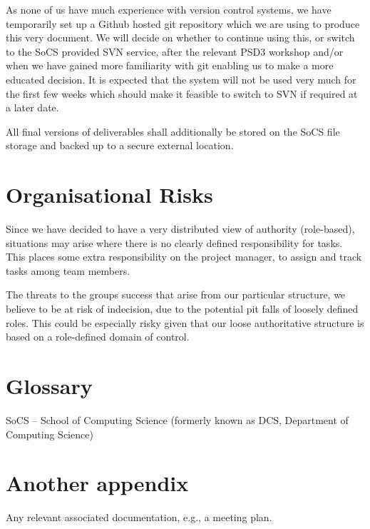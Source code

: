\documentclass{l3deliverable}
\begin{document}
As none of us have much experience with version control systems, we have temporarily set up a Github hosted git repository which we are using to produce this very document. We will decide on whether to continue using this, or switch to the SoCS provided SVN service, after the relevant PSD3 workshop and/or when we have gained more familiarity with git enabling us to make a more educated decision. It is expected that the system will not be used very much for the first few weeks which should make it feasible to switch to SVN if required at a later date.

All final versions of deliverables shall additionally be stored on the SoCS file storage and backed up to a secure external location.


\section{Organisational Risks}

Since we have decided to have a very distributed view of authority (role-based), situations may arise where there is no clearly defined responsibility for tasks. This places some extra responsibility on the project manager, to assign and track tasks among team members.

The threats to the groups success that arise from our particular structure, we believe to be at risk of indecision, due to the potential pit falls of loosely defined roles. This could be especially risky given that our loose authoritative structure is based on a role-defined domain of control.


\appendix

\section{Glossary}

SoCS -- School of Computing Science (formerly known as DCS, Department of Computing Science)

\section{Another appendix}

Any relevant associated documentation, e.g., a meeting plan.
\end{document}
